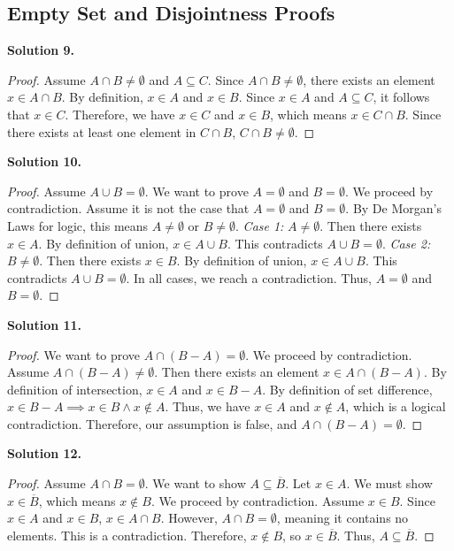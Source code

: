 \documentclass[11pt]{article}
\begin{document}
\subsection{Empty Set and Disjointness Proofs}

\noindent \textbf{Solution 9.}
\begin{proof}
Assume $A \cap B \neq \emptyset$ and $A \subseteq C$. Since $A \cap B \neq \emptyset$, there exists an element $x \in A \cap B$. By definition, $x \in A$ and $x \in B$. Since $x \in A$ and $A \subseteq C$, it follows that $x \in C$. Therefore, we have $x \in C$ and $x \in B$, which means $x \in C \cap B$. Since there exists at least one element in $C \cap B$, $C \cap B \neq \emptyset$.
\end{proof}

\noindent \textbf{Solution 10.}
\begin{proof}
Assume $A \cup B = \emptyset$. We want to prove $A = \emptyset$ and $B = \emptyset$. We proceed by contradiction. Assume it is not the case that $A = \emptyset$ and $B = \emptyset$. By De Morgan's Laws for logic, this means $A \neq \emptyset$ or $B \neq \emptyset$. 
\textit{Case 1:} $A \neq \emptyset$. Then there exists $x \in A$. By definition of union, $x \in A \cup B$. This contradicts $A \cup B = \emptyset$. 
\textit{Case 2:} $B \neq \emptyset$. Then there exists $x \in B$. By definition of union, $x \in A \cup B$. This contradicts $A \cup B = \emptyset$. 
In all cases, we reach a contradiction. Thus, $A = \emptyset$ and $B = \emptyset$.
\end{proof}

\noindent \textbf{Solution 11.}
\begin{proof}
We want to prove $A \cap (B - A) = \emptyset$. We proceed by contradiction. Assume $A \cap (B - A) \neq \emptyset$. Then there exists an element $x \in A \cap (B - A)$. By definition of intersection, $x \in A$ and $x \in B - A$. By definition of set difference, $x \in B - A \implies x \in B \land x \notin A$. Thus, we have $x \in A$ and $x \notin A$, which is a logical contradiction. Therefore, our assumption is false, and $A \cap (B - A) = \emptyset$.
\end{proof}

\noindent \textbf{Solution 12.}
\begin{proof}
Assume $A \cap B = \emptyset$. We want to show $A \subseteq \overline{B}$. Let $x \in A$. We must show $x \in \overline{B}$, which means $x \notin B$. We proceed by contradiction. Assume $x \in B$. Since $x \in A$ and $x \in B$, $x \in A \cap B$. However, $A \cap B = \emptyset$, meaning it contains no elements. This is a contradiction. Therefore, $x \notin B$, so $x \in \overline{B}$. Thus, $A \subseteq \overline{B}$.
\end{proof}
\end{document}
